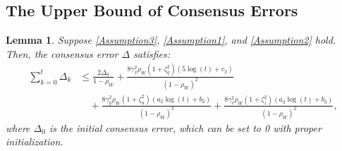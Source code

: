 \documentclass{article}
\theoremstyle{plain}
\newtheorem{lemma}[lemma]{Lemma}
\theoremstyle{definition}
\theoremstyle{remark}
\begin{document}
\subsection{The Upper Bound of Consensus Errors}
\begin{lemma}\label{Lemma5} Suppose \cref{Assumption3}, \cref{Assumption1}, and \cref{Assumption2} hold. Then, the consensus error $\Delta$ satisfies:
\begin{align}
 \sum_{k=0}^{t} \Delta_k 
&\leq \frac{2 \Delta_0}{1 - \rho_W} 
+ \frac{8 \gamma_x^2 \rho_W (1 + \zeta_q^2)( 5 \log(t) + c_2)}{(1 - \rho_W)^2} \nonumber \\
&\quad + \frac{8 \gamma_y^2 \rho_W (1 + \zeta_u^2)(a_2 \log(t) + b_2)}{(1 - \rho_W)^2}+\frac{8 \gamma_v^2 \rho_W (1 + \zeta_z^2)(a_3 \log(t) + b_3)}{(1 - \rho_W)^2}, \label{eq39}
\end{align}
where \(\Delta_0 \) is the initial consensus error, which can be set to 0 with proper initialization.
\end{lemma}
\end{document}
